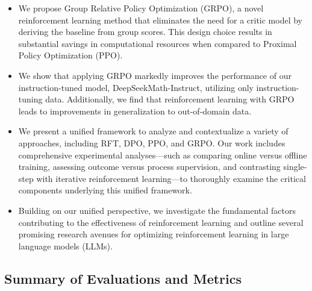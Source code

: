 \begin{itemize}[topsep=0pt]
    \item We propose Group Relative Policy Optimization (GRPO), a novel reinforcement learning method that eliminates the need for a critic model by deriving the baseline from group scores. This design choice results in substantial savings in computational resources when compared to Proximal Policy Optimization (PPO).
    \item We show that applying GRPO markedly improves the performance of our instruction-tuned model, DeepSeekMath-Instruct, utilizing only instruction-tuning data. Additionally, we find that reinforcement learning with GRPO leads to improvements in generalization to out-of-domain data.
    \item We present a unified framework to analyze and contextualize a variety of approaches, including RFT, DPO, PPO, and GRPO. Our work includes comprehensive experimental analyses—such as comparing online versus offline training, assessing outcome versus process supervision, and contrasting single-step with iterative reinforcement learning—to thoroughly examine the critical components underlying this unified framework.
    \item Building on our unified perspective, we investigate the fundamental factors contributing to the effectiveness of reinforcement learning and outline several promising research avenues for optimizing reinforcement learning in large language models (LLMs).
\end{itemize}

\subsection{Summary of Evaluations and Metrics}

